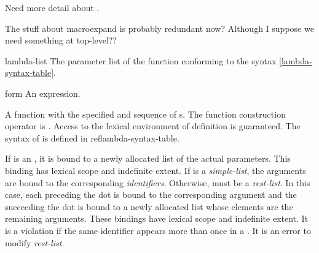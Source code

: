 \label{function}
%
\begin{optPrivate}
    Need more detail about .

    The stuff about macroexpand is probably redundant now?  Although I
    suppose we need something at top-level??
\end{optPrivate}
%
\begin{optDefinition}
%
%
\Syntax
\label{lambda-syntax-table}
%
%
\begin{arguments}
    \item[lambda-list] The parameter list of the function conforming to the
    syntax \ref{lambda-syntax-table}.
    \item[form] An expression.
\end{arguments}
%
\result%
A function with the specified  and sequence of s.
%
\remarks%
The function construction operator is .  Access to the
lexical environment of definition is guaranteed.  The syntax of 
is defined in ref{lambda-syntax-table}.

If  is an , it is bound to a newly allocated
list of the actual parameters.  This binding  has lexical scope and indefinite extent.  If
 is a {\em simple-list}, the arguments are bound to the
corresponding {\em identifiers}.  Otherwise,  must be a {\em
    rest-list}.  In this case, each  preceding the dot is bound
to the corresponding argument and the  succeeding the dot is
bound to a newly allocated list whose elements are the remaining arguments.
These bindings have lexical scope and indefinite extent.  It is a violation
if the same identifier appears more than once in a .  It is an
error to modify {\em rest-list}.


\end{optDefinition}
